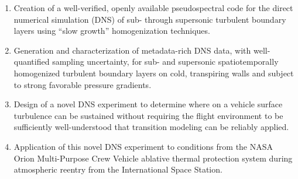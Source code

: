 \begin{enumerate}
    \item Creation of a well-verified, openly available pseudospectral
    code for the direct numerical simulation (DNS) of sub- through
    supersonic turbulent boundary layers using ``slow growth''
    homogenization techniques.

    \item Generation and characterization of metadata-rich DNS data,
    with well-quantified sampling uncertainty, for sub- and supersonic
    spatiotemporally homogenized turbulent boundary layers on cold,
    transpiring walls and subject to strong favorable pressure gradients.

    \item Design of a novel DNS experiment to determine where on a
    vehicle surface turbulence can be sustained without requiring the
    flight environment to be sufficiently well-understood that transition
    modeling can be reliably applied.

    \item Application of this novel DNS experiment to conditions
    from the NASA Orion Multi-Purpose Crew Vehicle ablative thermal
    protection system during atmospheric reentry from the International
    Space Station.
\end{enumerate}
